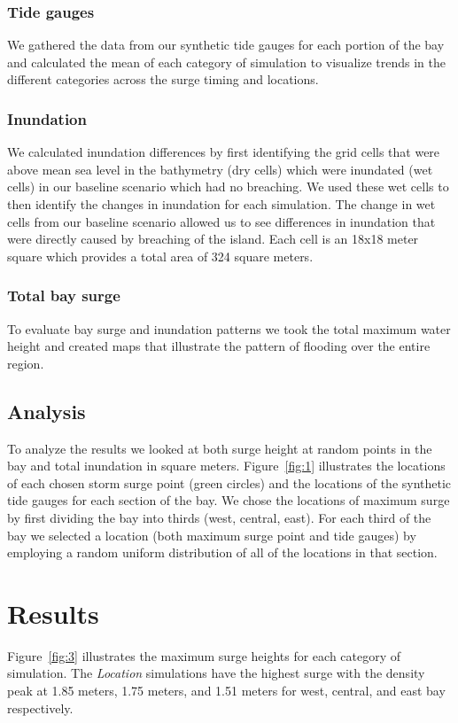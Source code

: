 \documentclass{coastal_paper}
\begin{document}
\subsubsection{Tide gauges}
We gathered the data from our synthetic tide gauges for each portion of the bay and calculated the mean of each category of simulation to visualize trends in the different categories across the surge timing and locations.
\subsubsection{Inundation}
We calculated inundation differences by first identifying the grid cells that were above mean sea level in the bathymetry (dry cells) which were inundated  (wet cells) in our baseline scenario which had no breaching. We used these wet cells to then identify the changes in inundation for each simulation. The change in wet cells from our baseline scenario allowed us to see differences in inundation that were directly caused by breaching of the island. Each cell is an 18x18 meter square which provides a total area of 324 square meters. 

\subsubsection{Total bay surge}
To evaluate bay surge and inundation patterns we took the total maximum water height and created maps that illustrate the pattern of flooding over the entire region.

\subsection{Analysis}
To analyze the results we looked at both surge height at random points in the bay and total inundation in square meters. Figure~\ref{fig:1} illustrates the locations of each chosen storm surge point (green circles) and the locations of the synthetic tide gauges for each section of the bay. We chose the locations of maximum surge by first dividing the bay into thirds (west, central, east). For each third of the bay we selected a location (both maximum surge point and tide gauges) by employing a random uniform distribution of all of the locations in that section. 

\section{Results}
 Figure~\ref{fig:3} illustrates the maximum surge heights for each category of simulation. The \emph{Location} simulations have the highest surge with the density peak at 1.85 meters, 1.75 meters, and 1.51 meters for west, central, and east bay respectively. 
\end{document}

